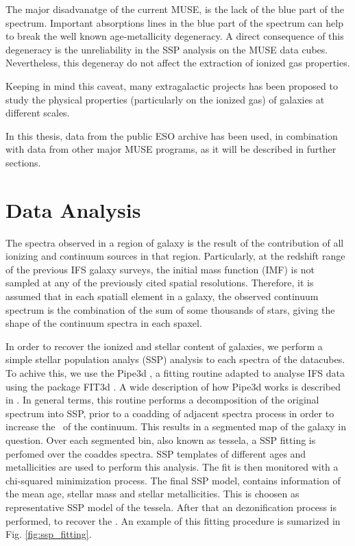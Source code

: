 The major disadvanatge of the current MUSE, is the lack of the blue part of the spectrum. 
Important absorptions lines in the blue part of the spectrum can help to break the well known age-metallicity degeneracy. 
A direct consequence of this degeneracy is the unreliability in the SSP analysis on the MUSE data cubes. 
Nevertheless, this degeneray do not affect the extraction of ionized gas properties.

Keeping in mind this caveat, many extragalactic projects has been proposed to study the physical
properties (particularly on the ionized gas) of galaxies at different scales. 

In this thesis, data from the public ESO archive has been used, in combination with data from other major MUSE programs, as it will be described in further sections.


\section{Data Analysis}

The spectra observed in a region of galaxy is the result of the contribution of all ionizing and continuum sources in that region. Particularly, at the redshift range of the
previous IFS galaxy surveys, the initial mass function (IMF) is not sampled at any of the previously cited spatial resolutions. Therefore, it is assumed that
in each spatiall element in a galaxy, the observed continuum spectrum is the combination of the sum of some thousands of stars, giving the shape of the continuum spectra in each spaxel.  

In order to recover the ionized and stellar content of galaxies, we perform a simple stellar population analys (SSP) analysis to each spectra of the datacubes.
To achive this, we use the {\sc Pipe3d} \cite{Pipe3D_I}, a fitting routine adapted to analyse IFS  data using the package {\sc FIT3d} \cite{Pipe3D_II}. A wide description
of how {\sc Pipe3d} works is described in  \cite{Pipe3D_I}. In general terms, this routine performs a decomposition of the original spectrum into SSP, 
prior to a coadding of adjacent spectra process in order to increase the \SN~of the continuum. This results in a segmented map of the galaxy in question. 
Over each segmented bin, also known as tessela, a SSP fitting is perfomed over the coaddes spectra. 
SSP templates of different ages and metallicities are used to perform this analysis. The fit is then monitored with a chi-squared minimization process. 
The final SSP model, contains information of the mean age, stellar mass and stellar metallicities. This is choosen as representative SSP model of the tessela. After that
an dezonification process is performed, to recover the . An example of this fitting procedure is sumarized in Fig. \ref{fig:ssp_fitting}. 

